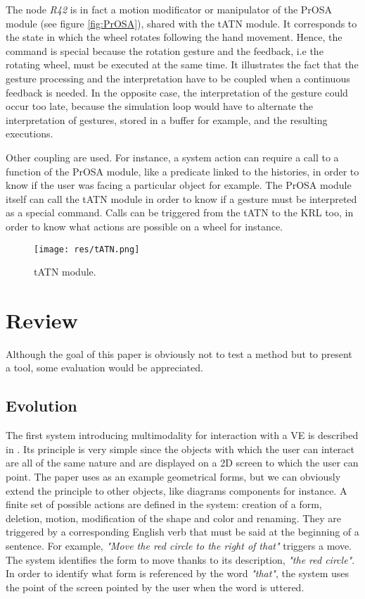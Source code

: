 \documentclass[a4paper]{article}
\begin{document}
The node \textit{R42} is in fact a motion modificator or manipulator of the PrOSA module (see figure \ref{fig:PrOSA}), shared with the tATN module. It corresponds to the state in which the wheel rotates following the hand movement. Hence, the command is special because the rotation gesture and the feedback, i.e the rotating wheel, must be executed at the same time. It illustrates the fact that the gesture processing and the interpretation have to be coupled when a continuous feedback is needed. In the opposite case, the interpretation of the gesture could occur too late, because the simulation loop would have to alternate the interpretation of gestures, stored in a buffer for example, and the resulting executions.

Other coupling are used. For instance, a system action can require a call to a function of the PrOSA module, like a predicate linked to the histories, in order to know if the user was facing a particular object for example. The PrOSA module itself can call the tATN module in order to know if a gesture must be interpreted as a special command. Calls can be triggered from the tATN to the KRL too, in order to know what actions are possible on a wheel for instance.

\begin{figure}
\centering
\texttt{[image: res/tATN.png]}
\caption{\label{fig:tATN}tATN module.}
\end{figure}

\section{Review}

Although the goal of this paper is obviously not to test a method but to present a tool, some evaluation would be appreciated.

\subsection{Evolution}

The first system introducing multimodality for interaction with a VE is described in \cite{putthatthere}. Its principle is very simple since the objects with which the user can interact are all of the same nature and are displayed on a 2D screen to which the user can point. The paper uses as an example geometrical forms, but we can obviously extend the principle to other objects, like diagrams components for instance. A finite set of possible actions are defined in the system: creation of a form, deletion, motion, modification of the shape and color and renaming. They are triggered by a corresponding English verb that must be said at the beginning of a sentence. For example, \textit{"Move the red circle to the right of that"} triggers a move. The system identifies the form to move thanks to its description, \textit{"the red circle"}. In order to identify what form is referenced by the word \textit{"that"}, the system uses the point of the screen pointed by the user when the word is uttered.
\end{document}

